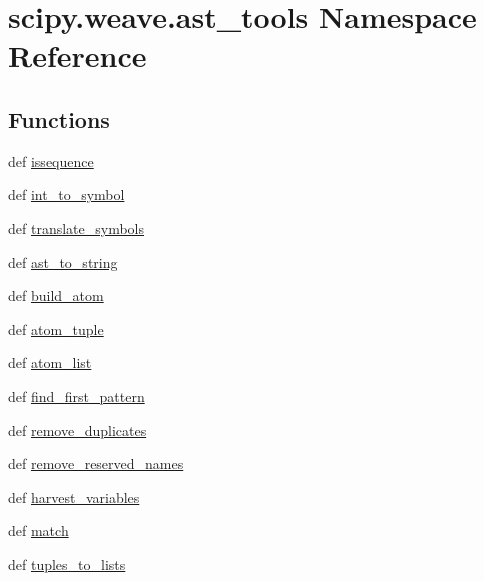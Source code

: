 \hypertarget{namespacescipy_1_1weave_1_1ast__tools}{}\section{scipy.\+weave.\+ast\+\_\+tools Namespace Reference}
\label{namespacescipy_1_1weave_1_1ast__tools}
\subsection*{Functions}
\begin{DoxyCompactItemize}
\item 
def \hyperlink{namespacescipy_1_1weave_1_1ast__tools_a4f2cc9ed3bbb26614c3e9565ae1cdd79}{issequence}
\item 
def \hyperlink{namespacescipy_1_1weave_1_1ast__tools_add93764edbf1516927d402df619b464d}{int\+\_\+to\+\_\+symbol}
\item 
def \hyperlink{namespacescipy_1_1weave_1_1ast__tools_a0cdc84940d51080f62e7cc378a8f3211}{translate\+\_\+symbols}
\item 
def \hyperlink{namespacescipy_1_1weave_1_1ast__tools_a1fdb303a2947fe1067bef3ed7fe812e0}{ast\+\_\+to\+\_\+string}
\item 
def \hyperlink{namespacescipy_1_1weave_1_1ast__tools_aa6e93d6020822a6753620f6964209c6f}{build\+\_\+atom}
\item 
def \hyperlink{namespacescipy_1_1weave_1_1ast__tools_aa9c569494d828a97c71b00d8aec09f8a}{atom\+\_\+tuple}
\item 
def \hyperlink{namespacescipy_1_1weave_1_1ast__tools_a5ce55cb86e9174042cc957b3e8e24627}{atom\+\_\+list}
\item 
def \hyperlink{namespacescipy_1_1weave_1_1ast__tools_ae390679c0fddec30b395bf09ad01c784}{find\+\_\+first\+\_\+pattern}
\item 
def \hyperlink{namespacescipy_1_1weave_1_1ast__tools_adab6f934ad952ab5fa9847d17e0d1d55}{remove\+\_\+duplicates}
\item 
def \hyperlink{namespacescipy_1_1weave_1_1ast__tools_a873e8330b38da37178b10dcee5e55c0a}{remove\+\_\+reserved\+\_\+names}
\item 
def \hyperlink{namespacescipy_1_1weave_1_1ast__tools_a1bebb83a381fb0c28a365bb9ca5f72cc}{harvest\+\_\+variables}
\item 
def \hyperlink{namespacescipy_1_1weave_1_1ast__tools_a83177554c3a143ef82dc51826c6eabc7}{match}
\item 
def \hyperlink{namespacescipy_1_1weave_1_1ast__tools_a7ff1f47e95b76ee06b80d083a2783d15}{tuples\+\_\+to\+\_\+lists}
\end{DoxyCompactItemize}
